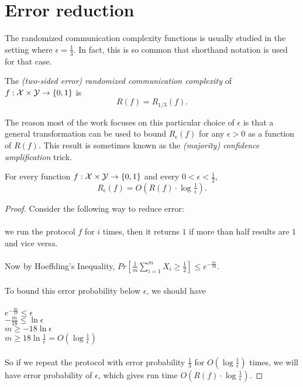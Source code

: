\section{Error reduction}

The randomized communication complexity functions is usually studied in the setting where $\epsilon = \frac13$. In fact, this is so common that shorthand notation is used for that case.

\begin{definition}
	The \emph{(two-sided error) randomized communication complexity} of $f : \mathcal{X} \times \mathcal{Y} \to \{0,1\}$ is
	\[
	R(f) = R_{1/3}(f).
	\]
\end{definition}

The reason most of the work focuses on this particular choice of $\epsilon$ is that a general transformation can be used to bound $R_\epsilon(f)$ for any $\epsilon > 0$ as a function of $R(f)$. This result is sometimes known as the \emph{(majority) confidence amplification} trick.

\begin{theorem}
	For every function $f : \mathcal{X} \times \mathcal{Y} \to \{0,1\}$ and every $0 < \epsilon < \frac12$, 
	\[
	R_\epsilon(f) = O\left( R(f) \cdot \log \tfrac1\epsilon \right).
	\]
\end{theorem}

\begin{proof}
	Consider the following way to reduce error: \\
	\\
	we run the protocol $f$ for $i$ times, then it returns $1$ if more than half results are $1$ and vice versa. \\
	\\
	Now by Hoeffding's Inequality, $Pr[\frac{1}{m}\sum_{i=1}^m X_i \ge \frac12] \leq e^{-\frac{m}{18}}$. \\
	\\
	To bound this error probability below $\epsilon$, we should have\\
	\\
	$e^{-\frac{m}{18}} \leq \epsilon$\\
	$-\frac{m}{18} \leq \ln \epsilon$\\
	$m\ge -18\ln \epsilon$ \\
	$m\ge 18\ln \frac{1}{\epsilon} = O(\log\frac{1}{\epsilon})$\\
	\\
	So if we repeat the protocol with error probability $\frac13$ for $O(\log\frac{1}{\epsilon})$ times, we will have error probability of $\epsilon$, which gives run time  $O\left( R(f) \cdot \log \tfrac1\epsilon \right)$.
\end{proof}

